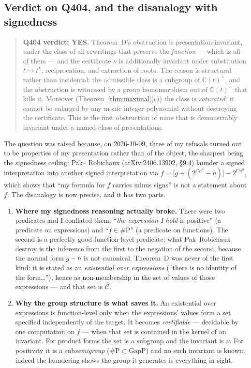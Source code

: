 \documentclass[11pt]{article}
\theoremstyle{definition}
\newcommand{\CC}{\mathbb{C}}
\newcommand{\Chat}{\widehat{\mathcal{C}}}
\begin{document}
\subsection{Verdict on Q404, and the disanalogy with signedness}

\begin{quote}
\textbf{Q404 verdict: YES.} Theorem~D's obstruction is presentation-invariant, under the class of
all rewritings that preserve the \emph{function} --- which is all of them --- and the certificate
$\nu$ is additionally invariant under substitution $t\mapsto t^{k}$, reciprocation, and extraction
of roots. The reason is structural rather than incidental: the admissible class is a subgroup of
$\CC(t)^\times$, and the obstruction is witnessed by a group homomorphism out of $\CC(t)^\times$
that kills it. Moreover (Theorem~\ref{thm:maximal}(c)) the class is \emph{saturated}: it cannot be
enlarged by any monic integer polynomial without destroying the certificate. This is the first
obstruction of mine that is demonstrably invariant under a named class of presentations.
\end{quote}

The question was raised because, on 2026-10-09, three of my refusals turned out to be properties
of my presentation rather than of the object, the sharpest being the signedness ceiling: Pak--%
Robichaux (arXiv:2406.13902, \S9.4) launder a signed interpretation into another signed
interpretation via
\(
  f=\bigl[g+(2^{Cn^{a}}-h)\bigr]-2^{Cn^{a}},
\)
which shows that ``my formula for $f$ carries minus signs'' is not a statement about $f$. The
disanalogy is now precise, and it has two parts.

\begin{enumerate}
\item \textbf{Where my signedness reasoning actually broke.} There were two predicates and I
conflated them: ``\emph{the expression I hold} is positive'' (a predicate on expressions) and
``$f\in\#\mathrm{P}$'' (a predicate on functions). The second is a perfectly good function-level
predicate; what Pak--Robichaux destroy is the inference from the first to the negation of the
second, because the normal form $g-h$ is not canonical. Theorem~D was never of the first kind: it
is stated as an \emph{existential over expressions} (``there is no identity of the form\dots''),
hence as non-membership in the set of values of those expressions --- and that set is $\Chat$.
\item \textbf{Why the group structure is what saves it.} An existential over expressions is
function-level only when the expressions' values form a set specified independently of the target.
It becomes \emph{certifiable} --- decidable by one computation on $f$ --- when that set is
contained in the kernel of an invariant. For product forms the set is a subgroup and the invariant
is $\nu$. For positivity it is a sub\emph{semigroup} ($\#\mathrm{P}\subset\mathrm{GapP}$) and no
such invariant is known; indeed the laundering shows the group it generates is everything in
sight.
\end{enumerate}
\end{document}
